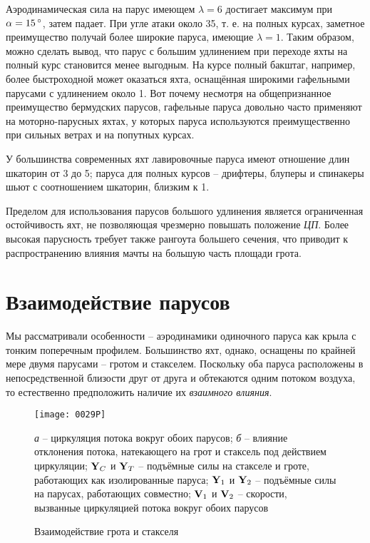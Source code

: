 Аэродинамическая сила на парус имеющем $\lambda = 6$ достигает
максимум при $\alpha = 15\,^\circ$, затем падает. При угле атаки около
35\gr, т. е. на полных курсах, заметное преимущество получай более
широкие паруса, имеющие $\lambda = 1$. Таким образом, можно сделать
вывод, что парус с большим удлинением при переходе яхты на полный курс
становится менее выгодным. На курсе полный бакштаг, например, более
быстроходной может оказаться яхта, оснащённая широкими гафельными
парусами с удлинением около 1. Вот почему несмотря на общепризнанное
преимущество бермудских парусов, гафельные паруса довольно часто
применяют на моторно-парусных яхтах, у которых паруса используются
преимущественно при сильных ветрах и на попутных курсах.

У большинства современных яхт лавировочные паруса имеют отношение длин
шкаторин от 3 до 5; паруса для полных курсов \--- дрифтеры, блуперы и
спинакеры шьют с соотношением шкаторин, близким к 1.

Пределом для использования парусов большого удлинения является
ограниченная остойчивость яхт, не позволяющая чрезмерно повышать
положение \textit{ЦП}. Более высокая парусность требует также рангоута
большего сечения, что приводит к распространению влияния мачты на
большую часть площади грота.

\section{Взаимодействие парусов}

Мы рассматривали особенности \--- аэродинамики одиночного паруса как
крыла с тонким поперечным профилем. Большинство яхт, однако, оснащены
по крайней мере двумя парусами \--- гротом и стакселем. Поскольку оба
паруса расположены в непосредственной близости друг от друга и
обтекаются одним потоком воздуха, то естественно предположить наличие
их \textit{взаимного влияния}.

\begin{figure}[htb]
  \centering
  \texttt{[image: 0029P]}
  \caption{Взаимодействие грота и стакселя}
  \label{fig:29}
  \small
  \centering{}
  \textit{а} \--- циркуляция потока вокруг обоих парусов; \textit{б} \--- влияние отклонения потока, натекающего на грот и стаксель под действием циркуляции; $\mathbf{Y}_C$ и $\mathbf{Y}_T$ \--- подъёмные силы на стакселе и гроте, работающих как изолированные паруса; $\mathbf{Y}_1$ и $\mathbf{Y}_2$ \--- подъёмные силы на парусах, работающих совместно; $\mathbf{V}_1$ и $\mathbf{V}_2$ \--- скорости, вызванные циркуляцией потока вокруг обоих парусов
\end{figure}

